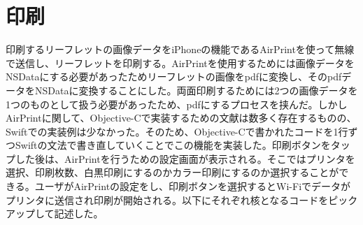 \section{印刷}
印刷するリーフレットの画像データをiPhoneの機能であるAirPrintを使って無線で送信し、リーフレットを印刷する。AirPrintを使用するためには画像データをNSDataにする必要があったためリーフレットの画像をpdfに変換し、そのpdfデータをNSDataに変換することにした。両面印刷するためには2つの画像データを1つのものとして扱う必要があったため、pdfにするプロセスを挟んだ。しかしAirPrintに関して、Objective-Cで実装するための文献は数多く存在するものの、Swiftでの実装例は少なかった。そのため、Objective-Cで書かれたコードを1行ずつSwiftの文法で書き直していくことでこの機能を実装した。印刷ボタンをタップした後は、AirPrintを行うための設定画面が表示される。そこではプリンタを選択、印刷枚数、白黒印刷にするのかカラー印刷にするのか選択することができる。ユーザがAirPrintの設定をし、印刷ボタンを選択するとWi-Fiでデータがプリンタに送信され印刷が開始される。以下にそれぞれ核となるコードをピックアップして記述した。
